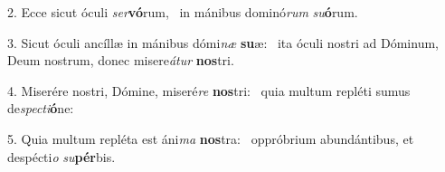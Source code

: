 2. Ecce sicut óculi \textit{ser}\textbf{vó}rum, \ast\  in mánibus dominó\textit{rum} \textit{su}\textbf{ó}rum.\

3. Sicut óculi ancíllæ in mánibus dómi\textit{næ} \textbf{su}æ: \ast\  ita óculi nostri ad Dóminum, Deum nostrum, donec misere\textit{á}\textit{tur} \textbf{nos}tri.\

4. Miserére nostri, Dómine, miseré\textit{re} \textbf{nos}tri: \ast\  quia multum repléti sumus de\textit{spec}\textit{ti}\textbf{ó}ne:\

5. Quia multum repléta est áni\textit{ma} \textbf{nos}tra: \ast\  oppróbrium abundántibus, et despécti\textit{o} \textit{su}\textbf{pér}bis.\

